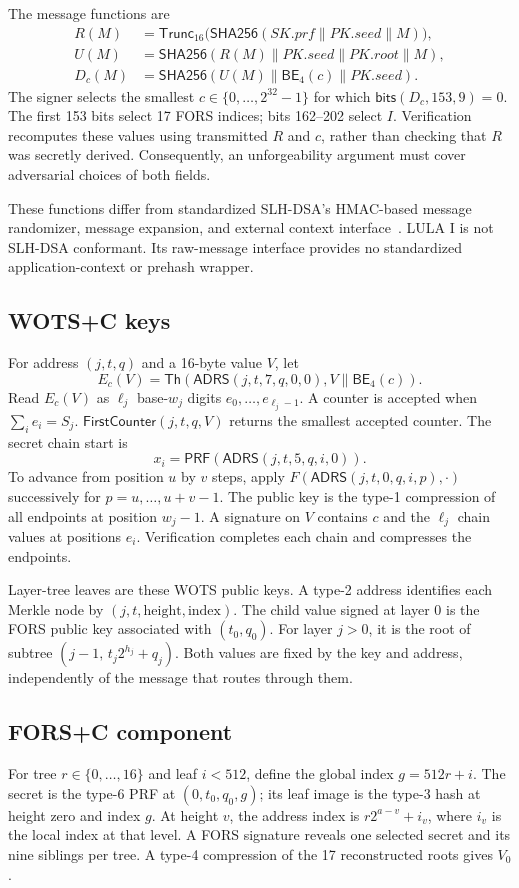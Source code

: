 \documentclass[a4paper,envcountsame,runningheads]{llncs}
\newcommand{\Hh}{\mathsf{SHA256}}
\newcommand{\Tr}{\mathsf{Trunc}_{16}}
\newcommand{\AD}{\mathsf{ADRS}}
\newcommand{\Th}{\mathsf{Th}}
\newcommand{\BE}{\mathsf{BE}_{4}}
\newcommand{\bits}{\mathsf{bits}}
\newcommand{\Ctr}{\mathsf{FirstCounter}}
\begin{document}
The message functions are
\begin{align}\label{eq:message}
 R(M)&=\Tr\bigl(\Hh(SK.prf\|PK.seed\|M)\bigr),\nonumber\\
 U(M)&=\Hh(R(M)\|PK.seed\|PK.root\|M),\\
 D_c(M)&=\Hh(U(M)\|\BE(c)\|PK.seed).\nonumber
\end{align}
The signer selects the smallest $c\in\{0,\ldots,2^{32}-1\}$ for which $\bits(D_c,153,9)=0$. The first 153 bits select 17 FORS indices; bits 162--202 select $I$. Verification recomputes these values using transmitted $R$ and $c$, rather than checking that $R$ was secretly derived. Consequently, an unforgeability argument must cover adversarial choices of both fields.

These functions differ from standardized SLH-DSA's HMAC-based message randomizer, message expansion, and external context interface~\cite[Sections~10.2, 10.3, and 11.2]{fips205}. LULA I is not SLH-DSA conformant. Its raw-message interface provides no standardized application-context or prehash wrapper.

\subsection{WOTS+C keys}
For address $(j,t,q)$ and a 16-byte value $V$, let
\[
 E_c(V)=\Th(\AD(j,t,7,q,0,0),V\|\BE(c)).
\]
Read $E_c(V)$ as $\ell_j$ base-$w_j$ digits $e_0,\ldots,e_{\ell_j-1}$. A counter is accepted when $\sum_i e_i=S_j$. $\Ctr(j,t,q,V)$ returns the smallest accepted counter. The secret chain start is
\[
 x_i=\mathsf{PRF}(\AD(j,t,5,q,i,0)).
\]
To advance from position $u$ by $v$ steps, apply $F(\AD(j,t,0,q,i,p),\cdot)$ successively for $p=u,\ldots,u+v-1$. The public key is the type-1 compression of all endpoints at position $w_j-1$. A signature on $V$ contains $c$ and the $\ell_j$ chain values at positions $e_i$. Verification completes each chain and compresses the endpoints.

Layer-tree leaves are these WOTS public keys. A type-2 address identifies each Merkle node by $(j,t,\text{height},\text{index})$. The child value signed at layer 0 is the FORS public key associated with $(t_0,q_0)$. For layer $j>0$, it is the root of subtree $(j-1,\,t_j2^{h_j}+q_j)$. Both values are fixed by the key and address, independently of the message that routes through them.

\subsection{FORS+C component}
For tree $r\in\{0,\ldots,16\}$ and leaf $i<512$, define the global index $g=512r+i$. The secret is the type-6 PRF at $(0,t_0,q_0,g)$; its leaf image is the type-3 hash at height zero and index $g$. At height $v$, the address index is $r2^{a-v}+i_v$, where $i_v$ is the local index at that level. A FORS signature reveals one selected secret and its nine siblings per tree. A type-4 compression of the 17 reconstructed roots gives $V_0$.
\end{document}

